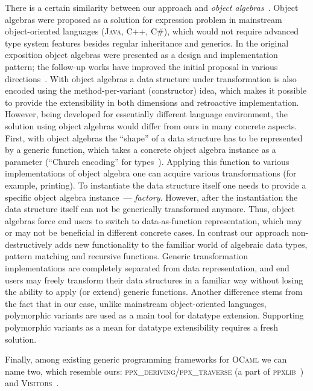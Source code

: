 There is a certain similarity between our approach and \emph{object algebras}~\cite{ObjectAlgebras}. Object algebras were proposed as a solution
for expression problem in mainstream object-oriented languages (\textsc{Java}, \textsc{C++}, \textsc{C\#}), which would not require advanced type system features besides
regular inheritance and generics. In the original exposition object algebras were presented as a design and implementation pattern; the follow-up
works have improved the initial proposal in various directions~\cite{ObjectAlgebrasAttribute,ObjectAlgebrasSYB}.
With object algebras a data structure under transformation is also encoded using the method-per-variant (constructor) idea, which makes it possible to
provide the extensibility in both dimensions and retroactive implementation. However, being developed for essentially different language environment,
the solution using object algebras would differ from ours in many concrete aspects. First, with object algebras the ``shape'' of a data structure has to
be represented by a generic function, which takes a concrete object algebra instance as a parameter (``Church encoding'' for types~\cite{Hinze}). Applying
this function to various implementations of object algebra one can acquire various transformations (for example, printing). To instantiate the data
structure itself one needs to provide a specific object algebra instance~--- \emph{factory}. However, after the instantiation the data structure itself
can not be generically transformed anymore. Thus, object algebras force end users to switch to data-as-function representation, which may or may not be
beneficial in different concrete cases. In contrast our approach non-destructively adds new functionality to the familiar world of algebraic data types,
pattern matching and recursive functions. Generic transformation implementations are completely separated from data representation, and end users may
freely transform their data structures in a familiar way without losing the ability to apply (or extend) generic functions. Another difference stems
from the fact that in our case, unlike mainstream object-oriented languages, polymorphic variants are used as a main tool for datatype extension.
Supporting polymorphic variants as a mean for datatype extensibility requires a fresh solution.

Finally, among existing generic programming frameworks for \textsc{OCaml} we can name two, which resemble ours: \textsc{ppx\_deriving}/\textsc{ppx\_traverse}
(a part of \textsc{ppxlib}~\cite{PPXLib}) and \textsc{Visitors}~\cite{Visitors}.

